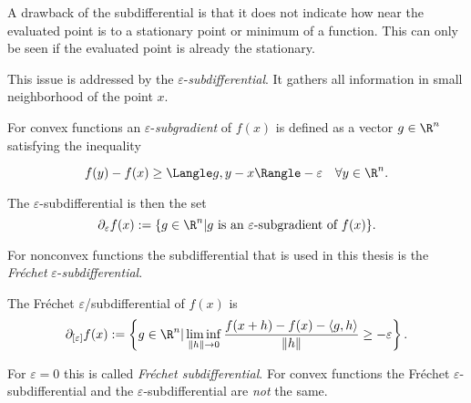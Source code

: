 
A drawback of the subdifferential is that it does not indicate how near the evaluated point is to a stationary point or minimum of a function. This can only be seen if the evaluated point is already the stationary.

This issue is addressed by the \(\varepsilon\)-\emph{subdifferential}. It gathers all information in small neighborhood of the point \(x\).

For convex functions an \(\varepsilon\)-\emph{subgradient} of \(f(x)\) is defined as a vector \(g \in \R^n\) satisfying the inequality

\[ f(y)-f(x) \geq \Langle g,y-x \Rangle - \varepsilon \quad \forall y \in \R^n.\]

The \(\varepsilon\)-subdifferential is then the set
\[ \partial_{\varepsilon} f(x) := \{g \in \R^n | g \text{ is an } \varepsilon \text{-subgradient of } f(x)\}. \]

For nonconvex functions the subdifferential that is used in this thesis is the \emph{Fr\'{e}chet} \(\varepsilon\)-\emph{subdifferential}.

\begin{definition}
	The Fr\'{e}chet \(\varepsilon\)/subdifferential of \(f(x)\) is
	\[ \partial_{[\varepsilon]}f(x) := \left\{ g \in \R^n | \liminf_{\|h\| \to 0} \frac{f(x+h)-f(x)-\langle g,h\rangle}{\|h\|}  \geq -\varepsilon\right\}. \]
\end{definition}

For \(\varepsilon = 0\) this is called \emph{Fr\'echet subdifferential}.
For convex functions the Fr\'echet \(\varepsilon\)-subdifferential and the \(\varepsilon\)-subdifferential are \emph{not} the same.



